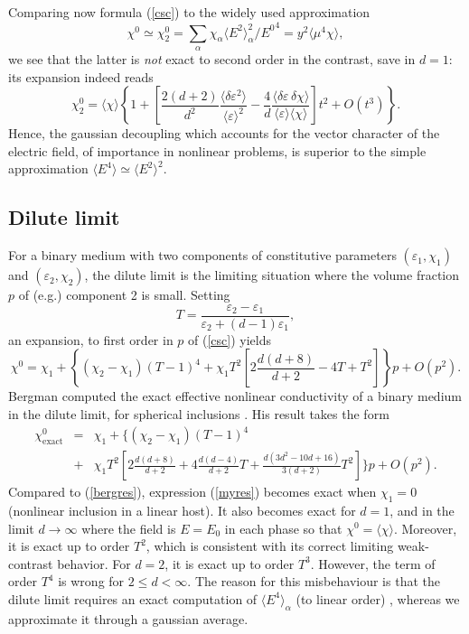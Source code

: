 Comparing now formula (\ref{csc}) to the widely used approximation
\begin{equation}
\label{chi02}
\chi^0\simeq\chi^0_2=\sum_\alpha \chi_\alpha 
\langle E^2\rangle_\alpha^2/{E^0}^4=y^2\langle \mu^4\chi\rangle, 
\end{equation}
we see that the latter is {\em not} exact to second order 
in the contrast, save in $d=1$: its expansion indeed reads
\begin{equation}
\chi^0_2=\langle\chi\rangle
\left\{1+\left[\frac{2(d+2)}{d^2}\frac{\langle\delta\varepsilon^2\rangle}
{\langle\varepsilon\rangle^2}-\frac{4}{d}
\frac{\langle\delta\varepsilon\,\delta\chi\rangle}
{\langle\varepsilon\rangle\langle\chi\rangle}\right]t^2+O(t^3)\right\}.
\end{equation}
Hence, the gaussian decoupling which accounts for the vector 
character of the electric field, of importance in nonlinear 
problems, is superior to the simple approximation $\langle 
E^4\rangle\simeq \langle E^2\rangle^2$.  

\subsection{Dilute limit}
For a binary medium with two components of constitutive 
parameters $(\varepsilon_1,\chi_1)$ and $(\varepsilon_2,\chi_2)$, 
the dilute limit is the limiting situation where the volume 
fraction $p$ of (e.g.) component 2 is small.
Setting
\begin{equation}
T=\frac{\varepsilon_2-\varepsilon_1}{\varepsilon_2+(d-1)\varepsilon_1},
\end{equation}
an expansion, to first order in $p$ of (\ref{csc}) yields
\begin{equation}
\label{myres}
\chi^0=\chi_1+\left\{(\chi_2-\chi_1) 
(T-1)^4+\chi_1T^2\left[2\frac{d(d+8)}{d+2}-4T+T^2\right]\right\}p+O(p^2).
\end{equation}
Bergman computed the exact effective nonlinear 
conductivity of a binary medium in the dilute limit, 
for spherical inclusions \cite{BERG89,ZHAN94}. His result takes the form
\begin{eqnarray}
\chi^0_{\text{exact}}&=&
\chi_1+\biggl\{(\chi_2-\chi_1) (T-1)^4\nonumber\\
\label{bergres}
&+&\chi_1T^2\left[2\frac{d(d+8)}{d+2}
+4\frac{d(d-4)}{d+2}T+\frac{d(3d^2-10d+16)}{3(d+2)}T^2\right]\biggr\}p+O(p^2).
\end{eqnarray}
Compared to (\ref{bergres}), expression (\ref{myres}) 
becomes exact when $\chi_1=0$ (nonlinear inclusion in 
a linear host). It also becomes exact for $d=1$, and 
in the limit $d\to\infty$ where the field is $E=E_0$ 
in each phase so that $\chi^0=\langle \chi\rangle$. 
Moreover, it is exact up to order $T^2$, which is 
consistent with its correct limiting weak-contrast 
behavior. For $d=2$, it is exact up to order $T^3$. 
However, the term of order $T^4$ is wrong for 
$2\le d<\infty$.
The reason for this misbehaviour is that the dilute limit requires 
an exact computation of $\langle E^4\rangle_\alpha$ (to linear order) 
\cite{BERG89}, whereas we approximate it through a gaussian average.

